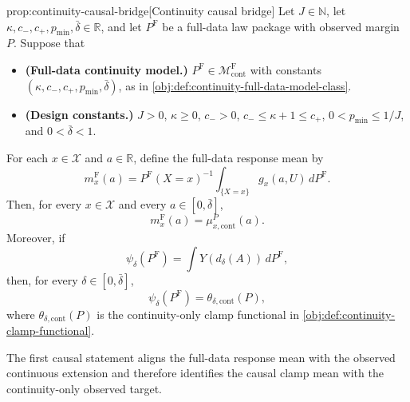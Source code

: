 \documentclass[11pt]{article}
\begin{document}
\begin{propositionv}{prop:continuity-causal-bridge}[Continuity causal bridge]
Let \(J\in\mathbb N\), let \(\kappa,c_-,c_+,p_{\min},\bar\delta\in\mathbb R\), and let \(P^{\mathrm F}\) be a full-data law package with observed margin \(P\).  Suppose that
\begin{itemize}
\item \textbf{(Full-data continuity model.)} \(P^{\mathrm F}\in\mathcal M_{\mathrm{cont}}^{\mathrm F}\) with constants \((\kappa,c_-,c_+,p_{\min},\bar\delta)\), as in \cref{obj:def:continuity-full-data-model-class}.
\item \textbf{(Design constants.)} \(J>0\), \(\kappa\geq0\), \(c_->0\), \(c_-\leq \kappa+1\leq c_+\), \(0<p_{\min}\leq 1/J\), and \(0<\bar\delta<1\).
\end{itemize}
For each \(x\in\mathcal X\) and \(a\in\mathbb R\), define the full-data response mean by
\[
m_x^{\mathrm F}(a)
=
P^{\mathrm F}(X=x)^{-1}
\int_{\{X=x\}} g_x(a,U)\,dP^{\mathrm F}.
\]
Then, for every \(x\in\mathcal X\) and every \(a\in[0,\bar\delta]\),
\[
m_x^{\mathrm F}(a)=\mu_{x,\mathrm{cont}}^P(a).
\]
Moreover, if
\[
\psi_\delta(P^{\mathrm F})
=
\int Y\!\left(d_\delta(A)\right)\,dP^{\mathrm F},
\]
then, for every \(\delta\in[0,\bar\delta]\),
\[
\psi_\delta(P^{\mathrm F})
=
\theta_{\delta,\mathrm{cont}}(P),
\]
where \(\theta_{\delta,\mathrm{cont}}(P)\) is the continuity-only clamp functional in \cref{obj:def:continuity-clamp-functional}.
\end{propositionv}

The first causal statement aligns the full-data response mean with the observed continuous extension and therefore identifies the causal clamp mean with the continuity-only observed target.
\end{document}
